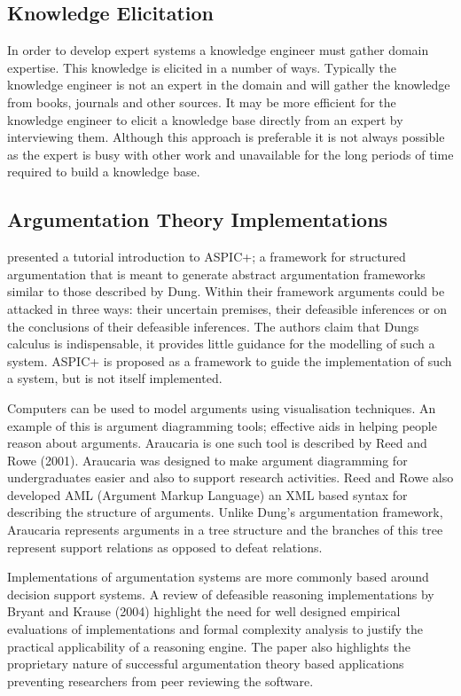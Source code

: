 \subsection{Knowledge Elicitation}

In order to develop expert systems a knowledge engineer must gather domain expertise. This knowledge is elicited in a number of ways. Typically the knowledge engineer is not an expert in the domain and will gather the knowledge from books, journals and other sources. It may be more efficient for the knowledge engineer to elicit a knowledge base directly from an expert by interviewing them. Although this approach is preferable it is not always possible as the expert is busy with other work and unavailable for the long periods of time required to build a knowledge base.



\subsection{Argumentation Theory Implementations}

\cite{modgil2014aspic+} presented a tutorial introduction to ASPIC+; a framework for structured argumentation that is meant to generate abstract argumentation frameworks similar to those described by Dung. Within their framework arguments could be attacked in three ways: their uncertain premises, their defeasible inferences or on the conclusions of their defeasible inferences. The authors claim that Dungs calculus is indispensable, it provides little guidance for the modelling of such a system. ASPIC+ is proposed as a framework to guide the implementation of such a system, but is not itself implemented.

Computers can be used to model arguments using visualisation techniques. An example of this is argument diagramming tools; effective aids in helping people reason about arguments. Araucaria is one such tool is described by Reed and Rowe (2001). Araucaria was designed to make argument diagramming for undergraduates easier and also to support research activities. Reed and Rowe also developed AML (Argument Markup Language) an XML based syntax for describing the structure of arguments. Unlike Dung’s argumentation framework, Araucaria represents arguments in a tree structure and the branches of this tree represent support relations as opposed to defeat relations.

Implementations of argumentation systems are more commonly based around decision support systems. A review of defeasible reasoning implementations by Bryant and Krause (2004) highlight the need for well designed empirical evaluations of implementations and formal complexity analysis to justify the practical applicability of a reasoning engine. The paper also highlights the proprietary nature of successful argumentation theory based applications preventing researchers from peer reviewing the software.

